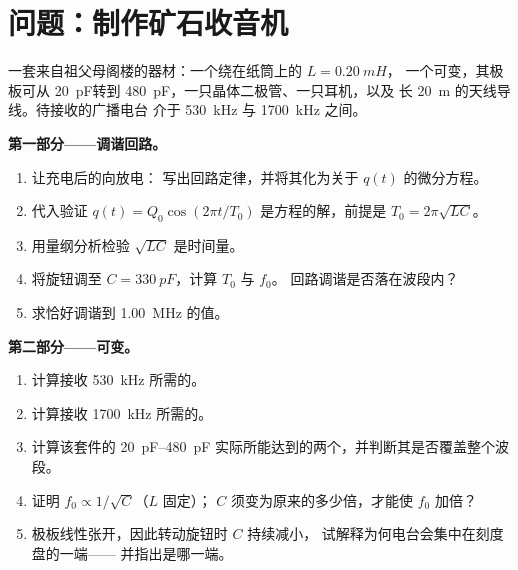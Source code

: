 \section{问题：制作矿石收音机}

\begin{problem}
\label{pb:g12:rlc-oscillations:1}
一套来自祖父母阁楼的器材：一个绕在纸筒上的 $L = \qty{0.20}{mH}$，
一个可变，其极板可从
\qty{20}{pF}转到 \qty{480}{pF}，一只晶体二极管、一只耳机，以及
长 \qty{20}{m} 的天线导线。待接收的广播电台
介于 \qty{530}{kHz} 与 \qty{1700}{kHz} 之间。

\medskip
\noindent\textbf{第一部分——调谐回路。}
\begin{enumerate}
  \item 让充电后的向放电：
        写出回路定律，并将其化为关于
        $q(t)$ 的微分方程。
  \item 代入验证 $q(t) = Q_0\cos(2\pi t/T_0)$
        是方程的解，前提是 $T_0 = 2\pi\sqrt{LC}$。
  \item 用量纲分析检验 $\sqrt{LC}$ 是时间量。
  \item 将旋钮调至 $C = \qty{330}{pF}$，计算 $T_0$ 与 $f_0$。
        回路调谐是否落在波段内？
  \item 求恰好调谐到 \qty{1.00}{MHz} 的值。
\end{enumerate}

\medskip
\noindent\textbf{第二部分——可变。}
\begin{enumerate}[resume]
  \item 计算接收 \qty{530}{kHz} 所需的。
  \item 计算接收 \qty{1700}{kHz} 所需的。
  \item 计算该套件的 \qtyrange{20}{480}{pF}
        实际所能达到的两个，并判断其是否覆盖整个波段。
  \item 证明 $f_0 \propto 1/\sqrt{C}$（$L$ 固定）；
        $C$ 须变为原来的多少倍，才能使 $f_0$ 加倍？
  \item 极板线性张开，因此转动旋钮时 $C$ 持续减小，
        试解释为何电台会集中在刻度盘的一端——
        并指出是哪一端。
\end{enumerate}


\end{problem}
